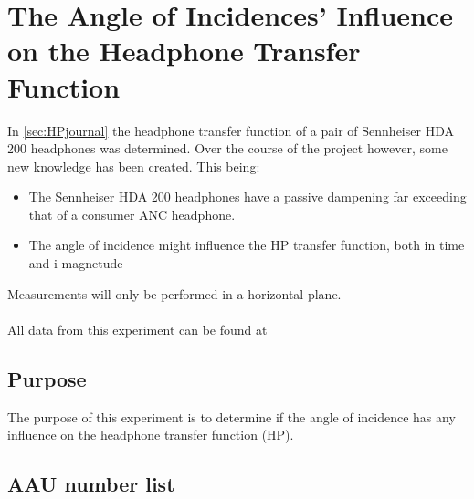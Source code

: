 
\section{The Angle of Incidences' Influence on the Headphone Transfer Function} \label{sec:AngleOfIncidence}
In \autoref{sec:HPjournal} the headphone transfer function of a pair of Sennheiser HDA 200 headphones was determined. Over the course of the project however, some new knowledge has been created. This being:
\begin{itemize}
	\item The Sennheiser HDA 200 headphones have a passive dampening far exceeding that of a consumer ANC headphone.
	\item The angle of incidence might influence the HP transfer function, both in time and i magnetude
\end{itemize}
Measurements will only be performed in a horizontal plane. 
\\\\
All data from this experiment can be found at

\subsection{Purpose}
The purpose of this experiment is to determine if the angle of incidence has any influence on the headphone transfer function (HP). 



\subsection{AAU number list}



